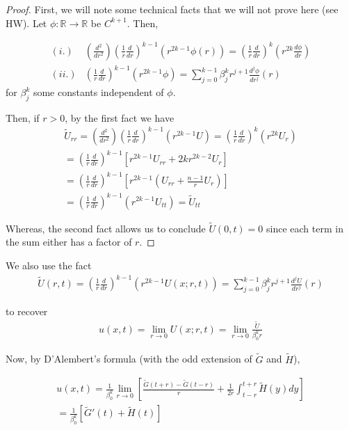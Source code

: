 \documentclass{article}
\newcommand{\R}{{\mathbb{R}}}
\begin{document}
	\begin{proof}
		First, we will note some technical facts that we will not prove here (see HW). Let $\phi: \R \to \R$ be $C^{k+1}$. Then,
		
		\begin{align*}
			(i.) & \left( \frac{d^{2}}{dr^{2}} \right) \left( \frac{1}{r} \frac{d}{dr} \right)^{k-1} (r^{2k-1} \phi(r) ) = \left(\frac{1}{r} \frac{d}{dr}\right)^{k} \left( r^{2k} \frac{d\phi}{dr} \right) \\
			(ii.) & \left( \frac{1}{r} \frac{d}{dr}\right)^{k-1} \left( r^{2k-1} \phi \right) = \sum_{j=0}^{k-1} \beta_{j}^{k} r^{j+1} \frac{d^{j} \phi}{dr^{j}}(r)
		\end{align*}
		for $\beta_{j}^{k}$ some constants independent of $\phi$.
		
		
		Then, if $r>0$, by the first fact we have
		\begin{align*}
			\tilde{U}_{rr} = \left( \frac{d^{2}}{dr^{2}} \right) \left( \frac{1}{r} \frac{d}{dr} \right)^{k-1} ( r^{2k-1}U) = \left(\frac{1}{r} \frac{d}{dr}\right)^{k} \left( r^{2k} U_{r} \right) \\
			= \left(\frac{1}{r} \frac{d}{dr}\right)^{k-1} [ r^{2k-1} U_{rr} + 2kr^{2k-2} U_{r}] \\
			= \left(\frac{1}{r} \frac{d}{dr}\right)^{k-1}  \left[ r^{2k-1}(U_{rr} + \frac{n-1}{r} U_{r})\right] \\
			= \left(\frac{1}{r} \frac{d}{dr}\right)^{k-1} (r^{2k-1} U_{tt}) = \tilde{U}_{tt}
		\end{align*}
		
		Whereas, the second fact allows us to conclude $\tilde{U}(0,t) = 0$ since each term in the sum either has a factor of $r$.
	\end{proof}
	
	
	We also use the fact 
	\begin{align*}
		\tilde{U}(r,t) = \left( \frac{1}{r} \frac{d}{dr}\right)^{k-1} \left( r^{2k-1} U(x;r,t) \right) = \sum_{j=0}^{k-1} \beta_{j}^{k} r^{j+1} \frac{d^{j} U}{dr^{j}}(r)
	\end{align*}
	
	to recover 
	\begin{align*}
		u(x,t) = \lim_{r \to 0} U(x;r,t) = \lim_{r \to 0} \frac{\tilde{U}}{\beta_{0}^{k} r} 
	\end{align*}
	
	Now, by D'Alembert's formula (with the odd extension of $\tilde{G}$ and $\tilde{H}$),
	
	\begin{align*}
		u(x,t) = \frac{1}{\beta_{0}^{k}} \lim_{r \to 0} \left[ \frac{\tilde{G}(t+r) - \tilde{G}(t-r)}{r} + \frac{1}{2r} \int_{t-r}^{t+r} \tilde{H}(y) dy\right] \\
		= \frac{1}{\beta_{0}^{k}} \left[\tilde{G}'(t) + \tilde{H}(t) \right] 
	\end{align*}
	
\end{document}
